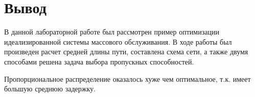 \documentclass[14pt,a4paper,report]{report}
\begin{document}
\section{Вывод}

В данной лабораторной работе был рассмотрен пример оптимизации идеализированной системы массового обслуживания.
В ходе работы был произведен расчет средней длины пути, составлена схема сети, а также двумя способами решена задача выбора пропускных способностей.

	Пропорциональное распределение оказалось хуже чем оптимальное, т.к. имеет большую среднюю задержку.
\end{document}
